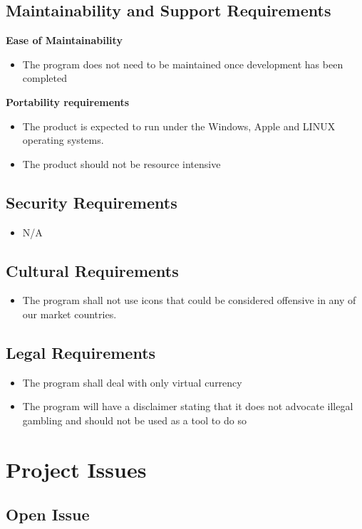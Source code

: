 \documentclass[12pt]{article}
\begin{document}
	\subsection{Maintainability and Support Requirements}
	\textbf{Ease of Maintainability}
	\begin{itemize}
	\item	The program does not need to be maintained once development has been completed
	\end{itemize}
	\textbf{Portability requirements}
	\begin{itemize}
	\item	The product is expected to run under the Windows, Apple and LINUX operating 				systems.
	\item 	The product should not be resource intensive
	\end{itemize}

	\subsection{Security Requirements}
	\begin{itemize}
	\item 	N/A
	\end{itemize}
	\subsection{Cultural Requirements}
	\begin{itemize}
	\item 	The program shall not use icons that could be considered offensive in any of 				our market countries.
	\end{itemize}
	\subsection{Legal Requirements}
	\begin{itemize}
	\item	The program shall deal with only virtual currency
	\item 	The program will have a disclaimer stating that it does not advocate illegal 				gambling and should not be used as a tool to do so
	\end{itemize}
	\section{Project Issues}
	\subsection{Open Issue}
\end{document}
